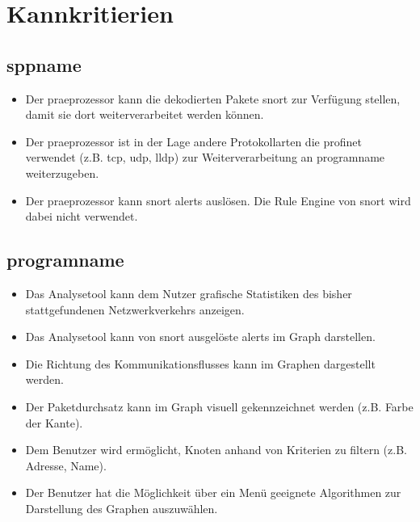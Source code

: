 \section{Kannkritierien}

\subsection{\gls{sppname}}

\begin{itemize}

\item Der \gls{praeprozessor} kann die dekodierten Pakete \gls{snort} zur Verfügung stellen, damit sie dort weiterverarbeitet werden können.

\item Der \gls{praeprozessor} ist in der Lage andere Protokollarten die \gls{profinet} verwendet (z.B. \gls{tcp}, \gls{udp}, \gls{lldp}) zur Weiterverarbeitung an \gls{programname} weiterzugeben.

\item Der \gls{praeprozessor} kann \gls{snort} \glspl{alert} auslösen. Die Rule Engine von \gls{snort} wird dabei nicht verwendet.
\end{itemize}

\subsection{\gls{programname}}

\begin{itemize}
\item Das Analysetool kann dem Nutzer grafische Statistiken des bisher stattgefundenen Netzwerkverkehrs anzeigen.

\item Das Analysetool kann von \gls{snort} ausgelöste \glspl{alert} im Graph darstellen.

\item Die Richtung des Kommunikationsflusses kann im Graphen dargestellt werden.

\item Der Paketdurchsatz kann im Graph visuell gekennzeichnet werden (z.B. Farbe der Kante).

\item Dem Benutzer wird ermöglicht, Knoten anhand von Kriterien zu filtern (z.B. Adresse, Name).

\item Der Benutzer hat die Möglichkeit über ein Menü geeignete Algorithmen zur Darstellung des Graphen auszuwählen.
\end{itemize}

